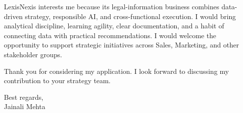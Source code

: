 \documentclass[letterpaper,11pt]{article}
\begin{document}
\bigbreak
LexisNexis interests me because its legal-information business combines data-driven strategy, responsible AI, and cross-functional execution. I would bring analytical discipline, learning agility, clear documentation, and a habit of connecting data with practical recommendations. I would welcome the opportunity to support strategic initiatives across Sales, Marketing, and other stakeholder groups.

\bigbreak
Thank you for considering my application. I look forward to discussing my contribution to your strategy team.

\bigbreak
Best regards,\\
Jainali Mehta
\end{document}
